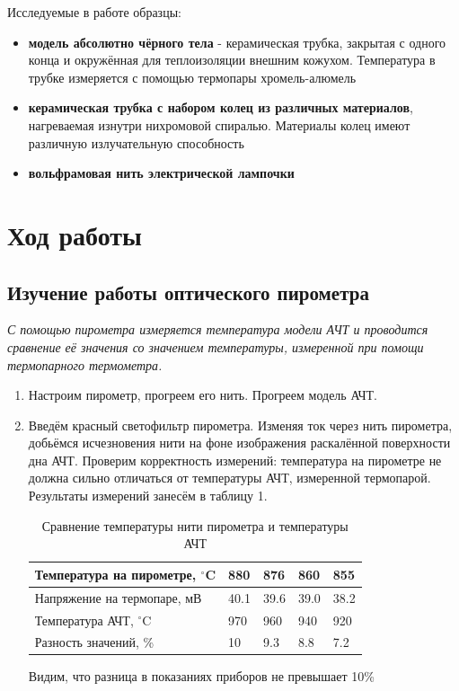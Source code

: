 \documentclass[a4paper]{article}
\begin{document}
Исследуемые в работе образцы:
\begin{itemize}
    \item \textbf{модель абсолютно чёрного тела} - керамическая трубка, закрытая с одного конца и окружённая для теплоизоляции внешним кожухом. Температура в трубке измеряется с помощью термопары хромель-алюмель
    \item \textbf{керамическая трубка с набором колец из различных материалов}, нагреваемая изнутри нихромовой спиралью. Материалы колец имеют различную излучательную способность
    \item \textbf{вольфрамовая нить электрической лампочки}
\end{itemize}

\newpage

\section{Ход работы}
\subsection{Изучение работы оптического пирометра}

\textit{С помощью пирометра измеряется температура модели АЧТ и проводится сравнение её значения  со значением температуры, измеренной при помощи термопарного термометра.}
\begin{enumerate}
    \item Настроим пирометр, прогреем его нить. Прогреем модель АЧТ.
    \item Введём красный светофильтр пирометра. Изменяя ток через нить пирометра, добьёмся исчезновения нити на фоне изображения раскалённой поверхности дна АЧТ. Проверим корректность измерений: температура на пирометре не должна сильно отличаться от температуры АЧТ, измеренной термопарой. Результаты измерений занесём в таблицу 1.

    \begin{table}[h]
    \centering
    \begin{center}
    \caption{Сравнение температуры нити пирометра и температуры АЧТ}
    \end{center}
    \vspace{0.1cm}
    \label{tab:my_label}
    \begin{tabular}{ |p{4.5cm}||p{1cm}|p{1cm}|p{1cm}|p{1cm}|}
 \hline
 Температура на пирометре, $^{\circ}$C & 880 & 876 & 860 & 855\\
\hline
Напряжение на термопаре, мВ & 40.1 & 39.6 & 39.0 & 38.2 \\
 \hline
 Температура АЧТ, $^{\circ}$C & 970 & 960 & 940 & 920 \\
  \hline
  Разность значений, \% & 10 & 9.3 & 8.8 & 7.2 \\
 \hline
\end{tabular}
\end{table} 

Видим, что разница в показаниях приборов не превышает 10\%
\end{enumerate}
\end{document}
